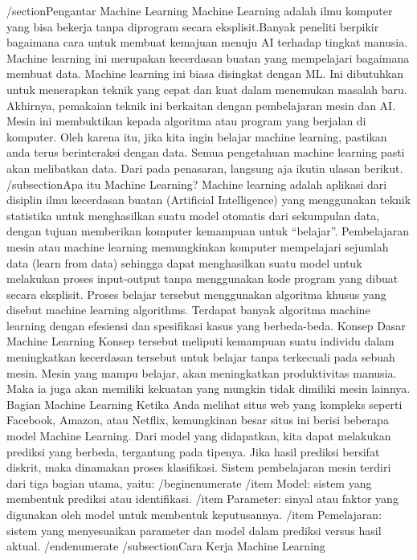 /section{Pengantar Machine Learning}
Machine Learning adalah ilmu komputer yang bisa bekerja tanpa diprogram secara eksplisit.Banyak peneliti berpikir bagaimana cara untuk membuat kemajuan menuju AI terhadap tingkat manusia. Machine learning ini merupakan kecerdasan buatan yang mempelajari bagaimana membuat data. Machine learning ini biasa disingkat dengan ML. Ini dibutuhkan untuk menerapkan teknik yang cepat dan kuat dalam menemukan masalah baru.
Akhirnya, pemakaian teknik ini berkaitan dengan pembelajaran mesin dan AI. Mesin ini membuktikan kepada algoritma atau program yang berjalan di komputer. Oleh karena itu, jika kita ingin belajar machine learning, pastikan anda terus berinteraksi dengan data. Semua pengetahuan machine learning pasti akan melibatkan data. Dari pada penasaran, langsung aja ikutin ulasan berikut.
/subsection{Apa itu Machine Learning?}
Machine learning adalah aplikasi dari disiplin ilmu kecerdasan buatan (Artificial Intelligence) yang menggunakan teknik statistika untuk menghasilkan suatu model otomatis dari sekumpulan data, dengan tujuan memberikan komputer kemampuan untuk “belajar”. Pembelajaran mesin atau machine learning memungkinkan komputer mempelajari sejumlah data (learn from data) sehingga dapat menghasilkan suatu model untuk melakukan proses input-output tanpa menggunakan kode program yang dibuat secara eksplisit. Proses belajar tersebut menggunakan algoritma khusus yang disebut machine learning algorithms. Terdapat banyak algoritma machine learning dengan efesiensi dan spesifikasi kasus yang berbeda-beda.
Konsep Dasar Machine Learning
Konsep tersebut meliputi kemampuan suatu individu dalam meningkatkan kecerdasan tersebut untuk belajar tanpa terkecuali pada sebuah mesin. Mesin yang mampu belajar, akan meningkatkan produktivitas manusia. Maka ia juga akan memiliki kekuatan yang mungkin tidak dimiliki mesin lainnya.
Bagian Machine Learning
Ketika Anda melihat situs web yang kompleks seperti Facebook, Amazon, atau Netflix, kemungkinan besar situs ini berisi beberapa model Machine Learning. Dari model yang didapatkan, kita dapat melakukan prediksi yang berbeda, tergantung pada tipenya. Jika hasil prediksi bersifat diskrit, maka dinamakan proses klasifikasi. Sistem pembelajaran mesin terdiri dari tiga bagian utama, yaitu:
/begin{enumerate}
/item Model: sistem yang membentuk prediksi atau identifikasi.
/item Parameter: sinyal atau faktor yang digunakan oleh model untuk membentuk keputusannya.
/item Pemelajaran: sistem yang menyesuaikan parameter dan model dalam prediksi versus hasil aktual.
/end{enumerate}
/subsection{Cara Kerja Machine Learning}
